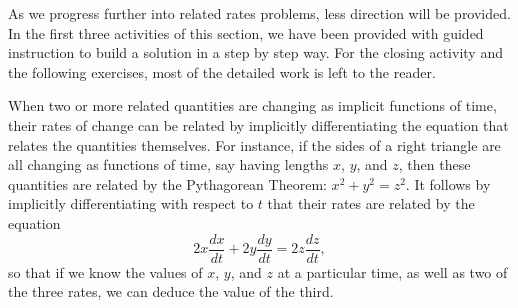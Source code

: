 As we progress further into related rates problems, less direction will be provided.  In the first three activities of this section, we have been provided with guided instruction to build a solution in a step by step way.  For the closing activity and the following exercises, most of the detailed work is left to the reader.



\newpage

\begin{summary}
\item When two or more related quantities are changing as implicit functions of time, their rates of change can be related by implicitly differentiating the equation that relates the quantities themselves.  For instance, if the sides of a right triangle are all changing as functions of time, say having lengths $x$, $y$, and $z$, then these quantities are related by the Pythagorean Theorem: $x^2 + y^2 = z^2$.  It follows by implicitly differentiating with respect to $t$ that their rates are related by the equation
$$2x \frac{dx}{dt} + 2y\frac{dy}{dt} = 2z \frac{dz}{dt},$$ 
so that if we know the values of $x$, $y$, and $z$ at a particular time, as well as two of the three rates, we can deduce the value of the third.
\end{summary}

\nin \hrulefill

 

\clearpage
